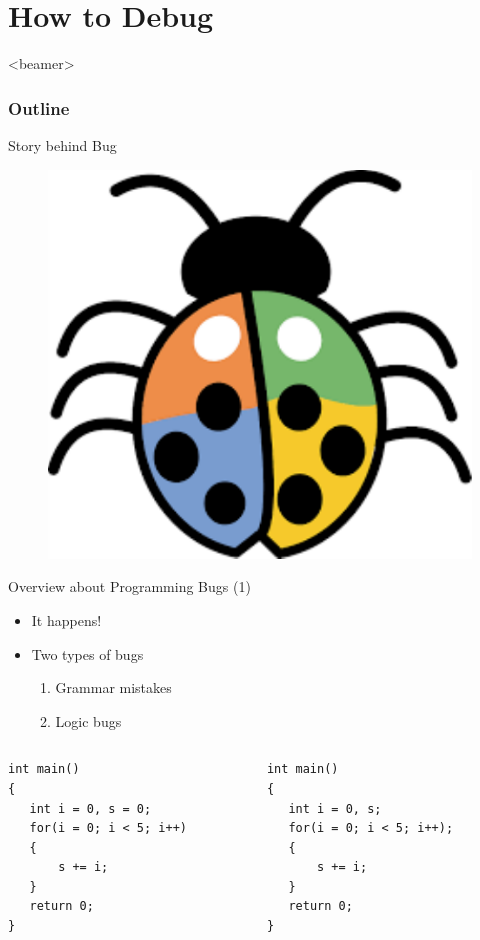 \section{How to Debug}
\label{sec:debug}
\begin{frame}<beamer>
    \frametitle{Outline}
    \tableofcontents[currentsection]
\end{frame}

\begin{frame}{Story behind Bug}
\begin{figure}
	\includegraphics[width=0.4\linewidth]{figs/debug.pdf}
\end{figure}
\end{frame}

\begin{frame}[fragile]{Overview about Programming Bugs (1)}
\begin{itemize}
	\item {It happens!}
	\item {Two types of bugs}
	\begin{enumerate}
		\item {Grammar mistakes}
		\item {Logic bugs}
	\end{enumerate}
\end{itemize}
\vspace{-0.1in}
\begin{columns}
\begin{column}{0.48\linewidth}
\begin{lstlisting}
int main()
{
   int i = 0, s = 0;
   for(i = 0; i < 5; i++)
   {
       s += i;
   }
   return 0;
}
\end{lstlisting}
\end{column}
\begin{column}{0.48\linewidth}
\begin{lstlisting}
int main()
{
   int i = 0, s;
   for(i = 0; i < 5; i++);
   {
       s += i;
   }
   return 0;
}
\end{lstlisting}
\end{column}
\end{columns}
\end{frame}

